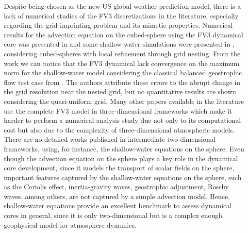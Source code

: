 Despite being chosen as the new US global weather prediction model,
there is a lack of numerical studies of the FV3 discretizations in the literature,
especially regarding the grid imprinting problem and its mimetic properties.
Numerical results for the advection equation on the cubed-sphere using the
FV3 dynamical core was presented in \citet{putman:2007} and some shallow-water 
simulations were presented in \citet{harris:2013}, considering cubed-spheres
with local refinement through grid nesting.
From the work \citet{harris:2013} we can notice that the FV3 dynamical
lack convergence on the maximum norm for the shallow-water model considering
the classical balanced geostrophic flow test case from \citet{will:1992}.
The authors attribute these errors to the abrupt change in the grid resolution
near the nested grid, but no quantitative results are shown considering the quasi-uniform grid.
Many other papers available in the literature use the complete FV3 model in three-dimensional
frameworks which make it harder to perform a numerical analysis study due not only to its computational cost
but also due to the complexity of three-dimensional atmospheric models.
There are no detailed works published in intermediate two-dimensional frameworks, using, for 
instance, the shallow-water equations on the sphere.
Even though the advection equation on the sphere plays a key role in the dynamical core development,
since it models the transport of scalar fields on the sphere, important features captured by the shallow-water
equations on the sphere, such as the Coriolis effect, inertia-gravity waves, geostrophic adjustment, Rossby waves,
among others, are not captured by a simple advection model.
Hence, shallow-water equations provide an excellent benchmark to assess dynamical cores in general,
since it is only two-dimensional but is a complex enough geophysical model for atmosphere dynamics.

